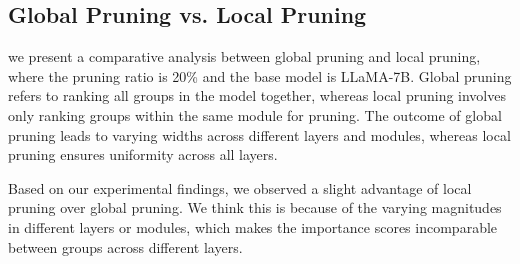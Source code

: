 \subsection{Global Pruning vs. Local Pruning}
we present a comparative analysis between global pruning and local pruning, where the pruning ratio is 20\% and the base model is LLaMA-7B. Global pruning refers to ranking all groups in the model together, whereas local pruning involves only ranking groups within the same module for pruning. The outcome of global pruning leads to varying widths across different layers and modules, whereas local pruning ensures uniformity across all layers.

Based on our experimental findings, we observed a slight advantage of local pruning over global pruning. We think this is because of the varying magnitudes in different layers or modules, which makes the importance scores incomparable between groups across different layers.

\begin{table}[h]
    \centering
    \vspace{-4mm}
    \caption{Results of global pruning and local pruning} \label{tbl:group_local_result}
\end{table}

